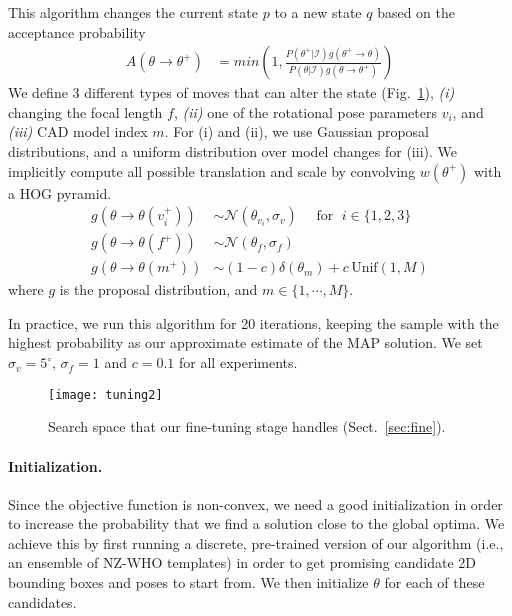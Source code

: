 This algorithm changes the current state $p$ to a new state $q$ based
on the acceptance probability
\begin{align}
    A(\theta \rightarrow \theta^+) & =  min\left( 1, \frac{P(\theta^+ |
            \mathcal{I}) g(\theta^+ \rightarrow \theta)}{P(\theta | \mathcal{I})
            g(\theta \rightarrow \theta^+)}\right)
\end{align}
We define $3$ different types of moves that can alter the state
(Fig.~\ref{fig:moves}), {\em (i)} changing the focal length $f$, {\em
(ii)} one of the rotational pose parameters $v_i$, and {\em (iii)} CAD model
index $m$. For (i) and (ii), we use Gaussian proposal distributions, and a
uniform distribution over model changes for (iii). We implicitly compute all
possible translation and scale by convolving $w(\theta^+)$ with a HOG pyramid.
\begin{align}
    g(\theta \rightarrow \theta(v_i^+)) & \sim
    \mathcal{N}(\theta_{v_i},\sigma_v) \quad \mbox{ for }\; i \in \{1,2,3\}\\
    g(\theta \rightarrow \theta(f^+)) & \sim \mathcal{N}(\theta_{f}, \sigma_f)\\
    g(\theta \rightarrow \theta(m^+)) & \sim (1-c) \delta(\theta_m) +
    c\,\textrm{Unif}(1,M)
\end{align}
where $g$ is the proposal distribution, and $m \in \{1,\cdots,M\}$. 
%

In practice, we run this algorithm for 20 iterations, keeping
the sample with the highest probability as our approximate estimate of
the MAP solution. We set $\sigma_v = 5^\circ$, $\sigma_f = 1$ and
$c = 0.1$ for all experiments.

\begin{figure}[t]
\centering
    \texttt{[image: tuning2]} \\ [-5pt]
    \caption{Search space that our fine-tuning stage handles (Sect.~\ref{sec:fine}).}
 \label{fig:moves}
\end{figure}


\paragraph{Initialization.}
Since the objective function is non-convex, we need a good initialization in order to
increase the probability that we find a solution close to the
global optima. We achieve this by first running a discrete,
pre-trained version of our algorithm (i.e., an ensemble of NZ-WHO
templates) in order to get promising candidate 2D bounding boxes and
poses to start from. We then initialize $\theta$ for each of these candidates.
